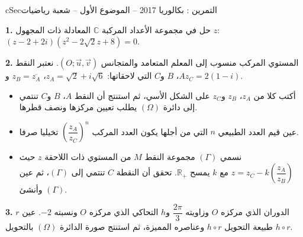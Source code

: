 \documentclass[12pt,a4paper]{article}
\newenvironment{BOX}[2]{\begin{otherlanguage}{english}\begin{arbox}{#1}{#2}}{\end{arbox}\end{otherlanguage}}
\newcounter{exo}
\newenvironment{tamrin}[1]{\stepcounter{exo}\begin{BOX}{cSec}{التمرين \theexo: #1}}{\end{BOX}}
\newenvironment{sq}{\begin{itemize}[leftmargin=2.4em,itemsep=3pt]}{\end{itemize}}
\newcommand{\qa}{\item[(أ)]}\newcommand{\qb}{\item[(ب)]}\newcommand{\qc}{\item[(جـ)]}\newcommand{\qd}{\item[(د)]}\newcommand{\qe}{\item[(هـ)]}
\newcommand{\QQ}[1]{\par\smallskip\textbf{#1.} }
\begin{document}
\begin{tamrin}{بكالوريا 2017 -- الموضوع الأول -- شعبة رياضيات}
\QQ{1} حل في مجموعة الأعداد المركبة $\mathbb{C}$ المعادلة ذات المجهول $z$: $\left(z-2+2i\right)\left(z^2-2\sqrt2z+8\right)=0$.

\QQ{2} المستوي المركب منسوب إلى المعلم المتعامد والمتجانس $\left(O;\vec u,\vec v\right)$.
نعتبر النقط $A$، $B$ و$C$ التي لاحقاتها: $z_A=\sqrt2+i\sqrt6$، $z_B=\overline{z_A}$ و$z_C=2(1-i)$.
\begin{sq}
\qa أكتب كلا من $z_A$، $z_B$ و$z_C$ على الشكل الأسي، ثم استنتج أن النقط $A$، $B$ و$C$ تنتمي إلى دائرة $(\Omega)$ يطلب تعيين مركزها ونصف قطرها.
\qb عين قيم العدد الطبيعي $n$ التي من أجلها يكون العدد المركب $\left(\dfrac{z_A}{z_C}\right)^n$ تخيليا صرفا.
\qc نسمي $(\Gamma)$ مجموعة النقط $M$ من المستوي ذات اللاحقة $z$ حيث $z=z_C-k\left(\dfrac{z_A}{z_B}\right)$ مع $k$ يمسح $\mathbb{R}_+$.
تحقق أن النقطة $C$ تنتمي إلى $(\Gamma)$، ثم عين وأنشئ $(\Gamma)$.
\end{sq}
\QQ{3} $r$ الدوران الذي مركزه $O$ وزاويته $\dfrac{2\pi}{3}$ و$h$ التحاكي الذي مركزه $O$ ونسبته $-2$.
عين طبيعة التحويل $h\circ r$ وعناصره المميزة، ثم استنتج صورة الدائرة $(\Omega)$ بالتحويل $h\circ r$.
\end{tamrin}
\end{document}
